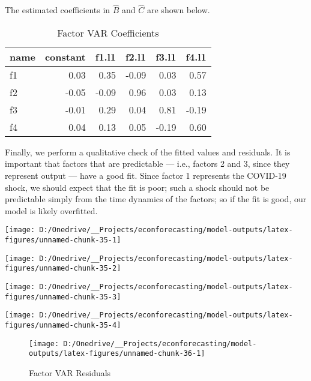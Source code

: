 \documentclass[11pt, letterpaper]{article}\usepackage[]{graphicx}\usepackage[]{color}
\begin{document}
The estimated coefficients in $\widehat{B}$ and $\widehat{C}$ are shown below.
\begin{table}[H]
\centering
\begingroup\footnotesize
\begin{tabular}{lrrrrr}
  \hline
name & constant & f1.l1 & f2.l1 & f3.l1 & f4.l1 \\ 
  \hline
f1 & 0.03 & 0.35 & -0.09 & 0.03 & 0.57 \\ 
  f2 & -0.05 & -0.09 & 0.96 & 0.03 & 0.13 \\ 
  f3 & -0.01 & 0.29 & 0.04 & 0.81 & -0.19 \\ 
  f4 & 0.04 & 0.13 & 0.05 & -0.19 & 0.60 \\ 
   \hline
\end{tabular}
\endgroup
\caption{Factor VAR Coefficients} 
\end{table}



Finally, we perform a qualitative check of the fitted values and residuals. It is important that factors that are predictable --- i.e., factors 2 and 3, since they represent output --- have a good fit. Since factor 1 represents the COVID-19 shock, we should expect that the fit is poor; such a shock should not be predictable simply from the time dynamics of the factors; so if the fit is good, our model is likely overfitted.


{\centering \texttt{[image: D:/Onedrive/\_\_Projects/econforecasting/model-outputs/latex-figures/unnamed-chunk-35-1]} 

}




{\centering \texttt{[image: D:/Onedrive/\_\_Projects/econforecasting/model-outputs/latex-figures/unnamed-chunk-35-2]} 

}




{\centering \texttt{[image: D:/Onedrive/\_\_Projects/econforecasting/model-outputs/latex-figures/unnamed-chunk-35-3]} 

}




{\centering \texttt{[image: D:/Onedrive/\_\_Projects/econforecasting/model-outputs/latex-figures/unnamed-chunk-35-4]} 

}





\begin{figure}[H]

{\centering \texttt{[image: D:/Onedrive/\_\_Projects/econforecasting/model-outputs/latex-figures/unnamed-chunk-36-1]} 

}

\caption[Factor VAR Residuals]{Factor VAR Residuals}\label{fig:unnamed-chunk-36}
\end{figure}
\end{document}
